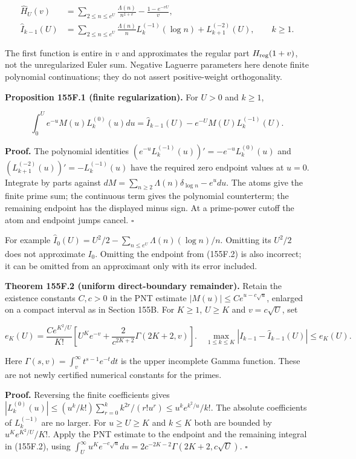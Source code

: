 \documentclass[
  11pt,
]{book}
\begin{document}
\[
\begin{aligned}
\widehat H_U(v)&=\sum_{2\le n\le e^U}\frac{\Lambda(n)}{n^{1+v}}
                 -\frac{1-e^{-vU}}v,\\
\widehat I_{k-1}(U)&=\sum_{2\le n\le e^U}\frac{\Lambda(n)}n
 L_k^{(-1)}(\log n)+L_{k+1}^{(-2)}(U),\qquad k\ge1.
\end{aligned}
\tag{155F.1}
\]

The first function is entire in \(v\) and approximates the regular part
\(H_{\rm reg}(1+v)\), not the unregularized Euler sum. Negative Laguerre
parameters here denote finite polynomial continuations; they do not
assert positive-weight orthogonality.

\textbf{Proposition 155F.1 (finite regularization).} For \(U>0\) and
\(k\ge1\),

\[
\boxed{\int_0^U e^{-u}M(u)L_k^{(0)}(u)du
=\widehat I_{k-1}(U)-e^{-U}M(U)L_k^{(-1)}(U).}
\tag{155F.2}
\]

\textbf{Proof.} The polynomial identities
\((e^{-u}L_k^{(-1)}(u))'=-e^{-u}L_k^{(0)}(u)\) and
\((L_{k+1}^{(-2)}(u))'=-L_k^{(-1)}(u)\) have the required zero endpoint
values at \(u=0\). Integrate by parts against
\(dM=\sum_{n\ge2}\Lambda(n)\delta_{\log n}-e^u du\). The atoms give the
finite prime sum; the continuous term gives the polynomial counterterm;
the remaining endpoint has the displayed minus sign. At a prime-power
cutoff the atom and endpoint jumps cancel. \(\square\)

For example \(\widehat I_0(U)=U^2/2-
\sum_{n\le e^U}\Lambda(n)(\log n)/n\). Omitting its \(U^2/2\) does not
approximate \(I_0\). Omitting the endpoint from (155F.2) is also
incorrect; it can be omitted from an approximant only with its error
included.

\textbf{Theorem 155F.2 (uniform direct-boundary remainder).} Retain the
existence constants \(C,c>0\) in the PNT estimate
\(|M(u)|\le Ce^{u-c\sqrt u}\), enlarged on a compact interval as in
Section 155B. For \(K\ge1\), \(U\ge K\) and \(v=c\sqrt U\), set

\[
 e_K(U)=\frac{Ce^{K^2/U}}{K!}
 \left[U^Ke^{-v}+\frac2{c^{2K+2}}\Gamma(2K+2,v)\right].
 \quad
 \max_{1\le k\le K}|I_{k-1}-\widehat I_{k-1}(U)|\le e_K(U).
\tag{155F.3}
\]

Here \(\Gamma(s,v)=\int_v^\infty t^{s-1}e^{-t}dt\) is the upper
incomplete Gamma function. These are not newly certified numerical
constants for the primes.

\textbf{Proof.} Reversing the finite coefficients gives
\(|L_k^{(0)}(u)|\le (u^k/k!)\sum_{r=0}^k k^{2r}/(r!u^r)
\le u^ke^{k^2/u}/k!\). The absolute coefficients of \(L_k^{(-1)}\) are
no larger. For \(u\ge U\ge K\) and \(k\le K\) both are bounded by
\(u^Ke^{K^2/U}/K!\). Apply the PNT estimate to the endpoint and the
remaining integral in (155F.2), using
\(\int_U^\infty u^Ke^{-c\sqrt u}du=2c^{-2K-2}\Gamma(2K+2,c\sqrt U)\).
\(\square\)
\end{document}

